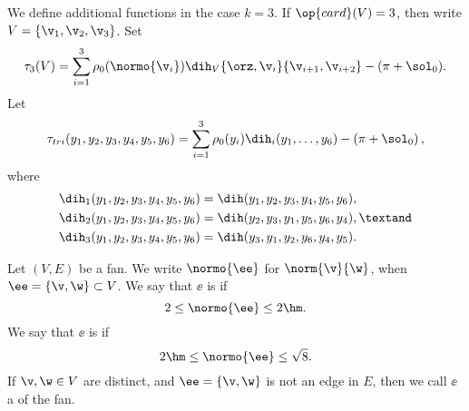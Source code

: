 \begin{definition}
  We define additional functions in the case $k=3$.
If $\op{card}(V) = 3$, then write $V =\{\v_1,\v_2,\v_3\}$.  Set
\[
\tau_3(V) = \sum_{i=1}^3 \rho_0(\normo{\v_i}) \dih_V\{\orz,\v_i\}\{\v_{i+1},\v_{i+2}\} - (\pi + \sol_0).
\]
Let 
\begin{equation}\label{eqn:tautri}
  \tau_{tri}(y_1,y_2,y_3,y_4,y_5,y_6) =
  \sum_{i=1}^3 \rho_0(y_i) \dih_i(y_1,\ldots,y_6)
- \left(\pi+{\sol_0}\right),
\end{equation}
where
\begin{align}\label{eqn:dihi}
\dih_1(y_1,y_2,y_3,y_4,y_5,y_6) &= \dih(y_1,y_2,y_3,y_4,y_5,y_6),\notag\\
\dih_2(y_1,y_2,y_3,y_4,y_5,y_6) &= \dih(y_2,y_3,y_1,y_5,y_6,y_4),\textand\notag \\
\dih_3(y_1,y_2,y_3,y_4,y_5,y_6) &= \dih(y_3,y_1,y_2,y_6,y_4,y_5).
\end{align}
%
%
%
%
%
%
%
\end{definition}


\begin{definition} 
Let $(V,E)$ be a fan.  
We write $\normo{\ee}$ for $\norm{\v}{\w}$, when $\ee=\{\v,\w\}\subset V$.
We say that  $\ee$ is  if
\[
2\le \normo{\ee}\le2\hm.
\]
We say that  $\ee$ is  if
\[
2\hm\le \normo{\ee}\le\sqrt{8}.
\]
If $\v,\w\in V$ are distinct, and $\ee=\{\v,\w\}$ is not an edge in $E$, then
we call $\ee$ a  of the fan.
\end{definition}


